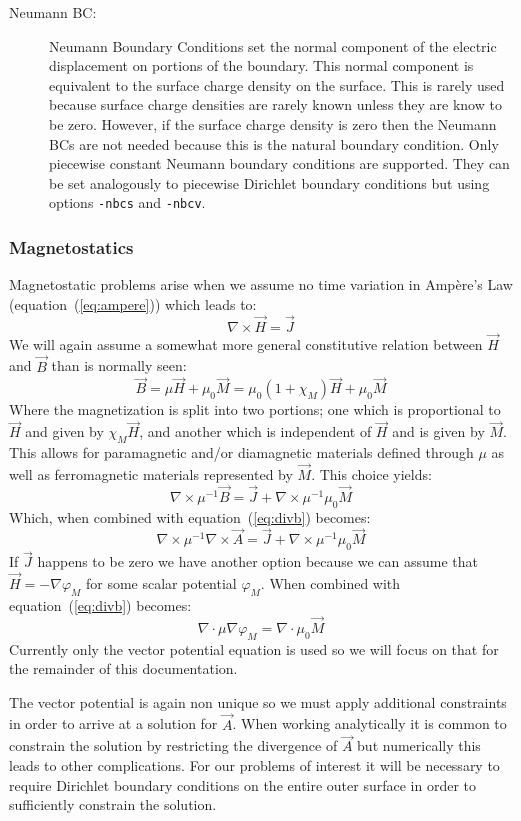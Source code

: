 \documentclass{article}
\newcommand{\refEq}[1]{(\ref{eq:#1})}
\newcommand{\Div}{\nabla\!\cdot\!}
\newcommand{\Curl}{\nabla\!\times\!}
\newcommand{\Grad}{\nabla\!}
\begin{document}
\begin{description}
\item[Neumann BC:] Neumann Boundary Conditions set the normal
  component of the electric displacement on portions of the boundary.
  This normal component is equivalent to the surface charge density on
  the surface.  This is rarely used because surface charge densities
  are rarely known unless they are know to be zero.  However, if the
  surface charge density is zero then the Neumann BCs are not needed
  because this is the natural boundary condition.  Only piecewise
  constant Neumann boundary conditions are supported.  They can be set
  analogously to piecewise Dirichlet boundary conditions but using
  options {\tt -nbcs} and {\tt -nbcv}.

\end{description}


\subsubsection{Magnetostatics}

Magnetostatic problems arise when we assume no time variation in
Amp\`ere's Law (equation~\refEq{ampere}) which leads to:
\[\Curl\vec{H}=\vec{J}\]
We will again assume a somewhat more general constitutive
relation between $\vec{H}$ and $\vec{B}$ than is normally seen:
\[\vec{B}=\mu\vec{H}+\mu_0\vec{M} = \mu_0\left(1+\chi_M\right)\vec{H}+\mu_0\vec{M}\]
Where the magnetization is split into two portions; one which is
proportional to $\vec{H}$ and given by $\chi_M\vec{H}$, and another
which is independent of $\vec{H}$ and is given by $\vec{M}$.  This
allows for paramagnetic and/or diamagnetic materials defined through
$\mu$ as well as ferromagnetic materials represented by $\vec{M}$.
This choice yields:
\[\Curl\mu^{-1}\vec{B}=\vec{J}+\Curl\mu^{-1}\mu_0\vec{M}\]
Which, when combined with equation~\refEq{divb} becomes:
\begin{equation}
\Curl\mu^{-1}\Curl\vec{A}=\vec{J}+\Curl\mu^{-1}\mu_0\vec{M}
\end{equation}
If $\vec{J}$ happens to be zero we have another option because we can
assume that $\vec{H} = -\Grad\varphi_M$ for some scalar potential
$\varphi_M$.  When combined with equation~\refEq{divb} becomes:
\begin{equation}
\Div\mu\Grad\varphi_M = \Div\mu_0\vec{M}
\end{equation}
Currently only the vector potential equation is used so we will focus
on that for the remainder of this documentation.

The vector potential is again non unique so we must apply additional
constraints in order to arrive at a solution for $\vec{A}$.  When
working analytically it is common to constrain the solution by
restricting the divergence of $\vec{A}$ but numerically this leads to
other complications.  For our problems of interest it will be
necessary to require Dirichlet boundary conditions on the entire outer
surface in order to sufficiently constrain the solution.
\end{document}
